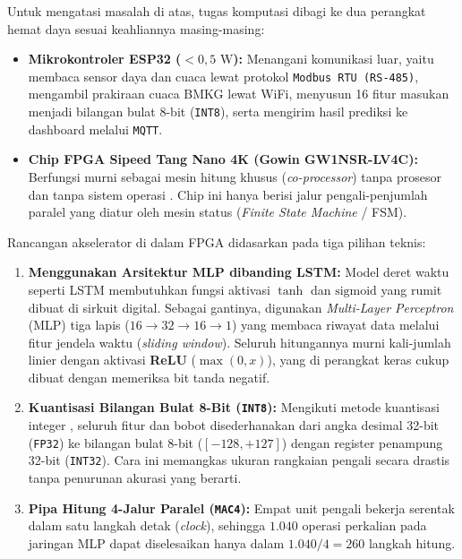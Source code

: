 \documentclass[12pt,a4paper]{article}
\begin{document}
Untuk mengatasi masalah di atas, tugas komputasi dibagi ke dua perangkat hemat daya sesuai keahliannya masing-masing:
\begin{itemize}[leftmargin=0.7cm, itemsep=3pt]
    \item \textbf{Mikrokontroler ESP32 ($< 0{,}5\text{ W}$):} Menangani komunikasi luar, yaitu membaca sensor daya dan cuaca lewat protokol \texttt{Modbus RTU (RS-485)}, mengambil prakiraan cuaca BMKG \cite{bmkg2026} lewat WiFi, menyusun 16 fitur masukan menjadi bilangan bulat 8-bit (\texttt{INT8}), serta mengirim hasil prediksi ke dashboard melalui \texttt{MQTT}.
    \item \textbf{Chip FPGA Sipeed Tang Nano 4K (Gowin GW1NSR-LV4C):} Berfungsi murni sebagai mesin hitung khusus (\textit{co-processor}) tanpa prosesor dan tanpa sistem operasi \cite{borras2022}. Chip ini hanya berisi jalur pengali-penjumlah paralel yang diatur oleh mesin status (\textit{Finite State Machine} / FSM).
\end{itemize}

Rancangan akselerator di dalam FPGA didasarkan pada tiga pilihan teknis:
\begin{enumerate}[leftmargin=0.7cm, itemsep=3pt]
    \item \textbf{Menggunakan Arsitektur MLP dibanding LSTM:} Model deret waktu seperti LSTM membutuhkan fungsi aktivasi $\tanh$ dan $\text{sigmoid}$ yang rumit dibuat di sirkuit digital. Sebagai gantinya, digunakan \textit{Multi-Layer Perceptron} (MLP) tiga lapis ($16 \to 32 \to 16 \to 1$) yang membaca riwayat data melalui fitur jendela waktu (\textit{sliding window}). Seluruh hitungannya murni kali-jumlah linier dengan aktivasi \textbf{ReLU} ($\max(0,x)$), yang di perangkat keras cukup dibuat dengan memeriksa bit tanda negatif.
    \item \textbf{Kuantisasi Bilangan Bulat 8-Bit (\texttt{INT8}):} Mengikuti metode kuantisasi integer \cite{jacob2018}, seluruh fitur dan bobot disederhanakan dari angka desimal 32-bit (\texttt{FP32}) ke bilangan bulat 8-bit ($[-128, +127]$) dengan register penampung 32-bit (\texttt{INT32}). Cara ini memangkas ukuran rangkaian pengali secara drastis tanpa penurunan akurasi yang berarti.
    \item \textbf{Pipa Hitung 4-Jalur Paralel (\texttt{MAC4}):} Empat unit pengali bekerja serentak dalam satu langkah detak (\textit{clock}), sehingga $1.040$ operasi perkalian pada jaringan MLP dapat diselesaikan hanya dalam $1.040 / 4 = 260$ langkah hitung.
\end{enumerate}
\end{document}
